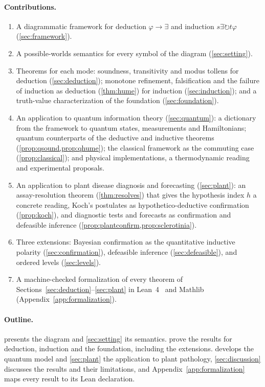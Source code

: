 \paragraph{Contributions.}
\begin{enumerate}
  \item A diagrammatic framework for deduction $\varphi\to\exists$ and induction
        $s\exists\circlearrowright t\varphi$ (\cref{sec:framework}).
  \item A possible-worlds semantics for every symbol of the diagram (\cref{sec:setting}).
  \item Theorems for each mode: soundness, transitivity and modus tollens for deduction
        (\cref{sec:deduction}); monotone refinement, falsification and the failure of
        induction as deduction (\cref{thm:hume}) for induction (\cref{sec:induction}); and a
        truth-value characterization of the foundation (\cref{sec:foundation}).
  \item An application to quantum information theory (\cref{sec:quantum}): a dictionary from the
        framework to quantum states, measurements and Hamiltonians; quantum counterparts of the
        deductive and inductive theorems (\cref{prop:qsound,prop:qhume}); the classical
        framework as the commuting case (\cref{prop:classical}); and physical implementations,
        a thermodynamic reading and experimental proposals.
  \item An application to plant disease diagnosis and forecasting (\cref{sec:plant}): an
        assay-resolution theorem (\cref{thm:resolves}) that gives the hypothesis index $h$ a
        concrete reading, Koch's postulates as hypothetico-deductive confirmation
        (\cref{prop:koch}), and diagnostic tests and forecasts as confirmation and defeasible
        inference (\cref{prop:plantconfirm,prop:sclerotinia}).
  \item Three extensions: Bayesian confirmation as the quantitative inductive polarity
        (\cref{sec:confirmation}), defeasible inference (\cref{sec:defeasible}), and ordered
        levels (\cref{sec:levels}).
  \item A machine-checked formalization of every theorem of
        Sections~\ref{sec:deduction}--\ref{sec:plant} in Lean~4~\cite{lean4} and
        Mathlib~\cite{mathlib} (Appendix~\ref{app:formalization}).
\end{enumerate}

\paragraph{Outline.}  presents the diagram and \cref{sec:setting} its
semantics.  prove the results for deduction,
induction and the foundation, including the extensions.  develops the quantum
model and \cref{sec:plant} the application to plant pathology, \cref{sec:discussion} discusses the results and their limitations, and
Appendix~\ref{app:formalization} maps every result to its Lean declaration.
